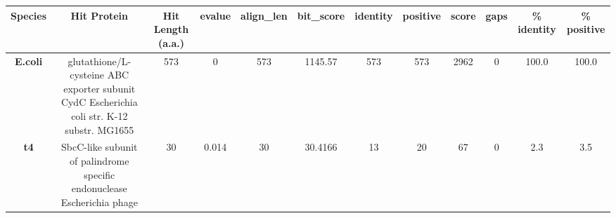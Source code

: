 \begin{tabular}{|c|c|c|c|c|c|c|c|c|c|c|c|} \hline
\textbf{Species} & \textbf{Hit Protein} & \textbf{Hit Length (a.a.)} & \textbf{evalue} & \textbf{align\_len} & \textbf{bit\_score} & \textbf{identity} & \textbf{positive} & \textbf{score} & \textbf{gaps} & \textbf{\% identity} & \textbf{\% positive} \\ \hline
\textbf{E.coli} & glutathione/L-cysteine ABC exporter subunit CydC Escherichia coli str. K-12 substr. MG1655 & 573 & 0 & 573 & 1145.57 & 573 & 573 & 2962 & 0 & 100.0 & 100.0\\
\textbf{t4} & SbcC-like subunit of palindrome specific endonuclease Escherichia phage  & 30 & 0.014 & 30 & 30.4166 & 13 & 20 & 67 & 0 & 2.3 & 3.5\\
\hline \end{tabular}
